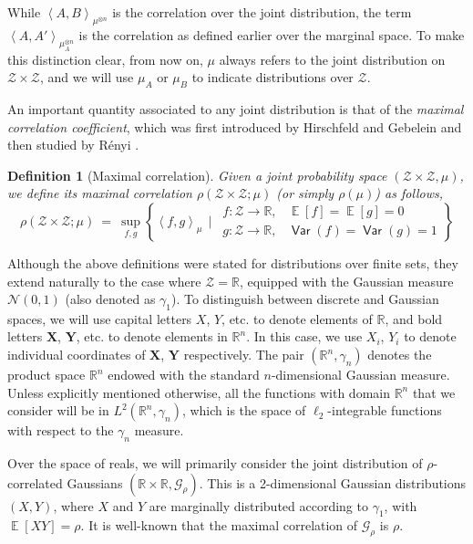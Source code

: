 \documentclass[11pt]{article}
\newcommand{\inbrace}[1]{\left \{ #1 \right \}}
\newcommand{\inangle}[1]{\left \langle #1 \right \rangle}
\newcommand{\inmat}[1]{\begin{matrix} #1 \end{matrix}}
\newcommand{\set}[1]{\inbrace{#1}}
\DeclareMathOperator*{\Ex}{\mathbb{E}}
\DeclareMathOperator*{\Var}{\mathsf{Var}}
\newcommand{\bbR}{{\mathbb R}}
\newcommand{\bX}{\mathbf{X}}
\newcommand{\bY}{\mathbf{Y}}
\newcommand{\calG}{\mathcal{G}}
\newcommand{\calN}{\mathcal{N}}
\newcommand{\calZ}{\mathcal{Z}}
\newtheorem{defn}[theorem]{Definition}
\begin{document}
 While $\inangle{A, B}_{\mu^{\otimes n}}$ is the correlation over the joint distribution, the term $\inangle{A, A'}_{\mu_A^{\otimes n}}$ is the correlation as defined earlier over the marginal space. To make this distinction clear, from now on, $\mu$ always refers to the joint distribution on $\calZ \times \calZ$, and we will use $\mu_A$ or $\mu_B$ to indicate distributions over $\calZ$.

\noindent An important quantity associated to any joint distribution is that of the {\em maximal correlation coefficient}, which was first introduced by Hirschfeld \cite{hirschfeld1935connection} and Gebelein \cite{gebelein1941statistische} and then studied by R{\'e}nyi \cite{renyi1959measures}.

\begin{defn}[Maximal correlation] \label{def:max_corr}
	Given a joint probability space $(\calZ \times \calZ, \mu)$, we define its {\em maximal correlation} $\rho(\calZ \times \calZ; \mu)$ (or simply $\rho(\mu)$) as follows,
	\[ \rho(\calZ \times \calZ; \mu) ~=~ \sup_{f, g} \set{\inangle{f,g}_{\mu} \ \ \bigg | \ \ \inmat{f : \calZ \to \bbR, & \Ex[f] = \Ex[g]= 0\\ g : \calZ \to \bbR, & \Var(f) = \Var(g) = 1}} \]
\end{defn}

Although the above definitions were stated for distributions over finite sets, they extend naturally to the case where $\calZ = \bbR$, equipped with the Gaussian measure $\calN(0,1)$ (also denoted as $\gamma_1$). To distinguish between discrete and Gaussian spaces, we will use capital letters $X$, $Y$, etc. to denote elements of $\bbR$, and bold letters $\bX$, $\bY$, etc. to denote elements in $\bbR^n$. In this case, we use $X_i$, $Y_i$ to denote individual coordinates of $\bX$, $\bY$ respectively. The pair $(\bbR^n, \gamma_n)$ denotes the product space $\bbR^n$ endowed with the standard $n$-dimensional Gaussian measure. Unless explicitly mentioned otherwise, all the functions with domain $\bbR^n$ that we consider will be in $L^2(\bbR^n, \gamma_n)$, which is the space of $\ell_2$-integrable functions with respect to the $\gamma_n$ measure.

Over the space of reals, we will primarily consider the joint distribution of $\rho$-correlated Gaussians $(\bbR \times \bbR, \calG_\rho)$. This is a 2-dimensional Gaussian distributions $(X,Y)$, where $X$ and $Y$ are marginally distributed according to $\gamma_1$, with $\Ex[XY] = \rho$. It is well-known that the maximal correlation of $\calG_\rho$ is $\rho$.
\end{document}
